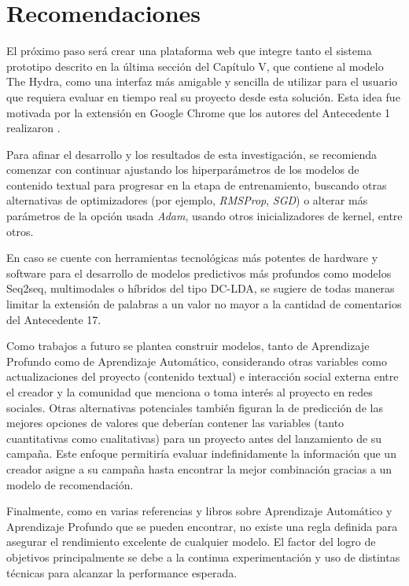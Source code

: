 \section{Recomendaciones}
El próximo paso será crear una plataforma web que integre tanto el sistema prototipo descrito en la última sección del Capítulo V, que contiene al modelo The Hydra, como una interfaz más amigable y sencilla de utilizar para el usuario que requiera evaluar en tiempo real su proyecto desde esta solución. Esta idea fue motivada por la extensión en Google Chrome que los autores del Antecedente 1 realizaron \parencite{pr_chen2013kickpredict}.

Para afinar el desarrollo y los resultados de esta investigación, se recomienda comenzar con continuar ajustando los hiperparámetros de los modelos de contenido textual para progresar en la etapa de entrenamiento, buscando otras alternativas de optimizadores (por ejemplo, \textit{RMSProp}, \textit{SGD}) o alterar más parámetros de la opción usada \textit{Adam}, usando otros inicializadores de kernel, entre otros.

En caso se cuente con herramientas tecnológicas más potentes de hardware y software para el desarrollo de modelos predictivos más profundos como modelos Seq2seq, multimodales o híbridos del tipo DC-LDA, se sugiere de todas maneras limitar la extensión de palabras a un valor no mayor a la cantidad de comentarios del Antecedente 17.

Como trabajos a futuro se plantea construir modelos, tanto de Aprendizaje Profundo como de Aprendizaje Automático, considerando otras variables como actualizaciones del proyecto (contenido textual) e interacción social externa entre el creador y la comunidad que menciona o toma interés al proyecto en redes sociales. Otras alternativas potenciales también figuran la de predicción de las mejores opciones de valores que deberían contener las variables (tanto cuantitativas como cualitativas) para un proyecto antes del lanzamiento de su campaña. Este enfoque permitiría evaluar indefinidamente la información que un creador asigne a su campaña hasta encontrar la mejor combinación gracias a un modelo de recomendación.

Finalmente, como en varias referencias y libros sobre Aprendizaje Automático y Aprendizaje Profundo que se pueden encontrar, no existe una regla definida para asegurar el rendimiento excelente de cualquier modelo. El factor del logro de objetivos principalmente se debe a la continua experimentación y uso de distintas técnicas para alcanzar la performance esperada.